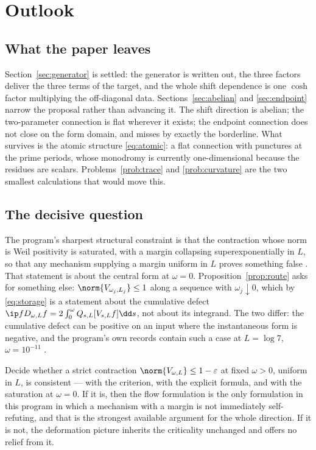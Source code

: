 \section{Outlook}\label{sec:outlook}

\subsection{What the paper leaves}

Section~\ref{sec:generator} is settled: the generator is written out, the three
factors deliver the three terms of the target, and the whole shift dependence is
one $\cosh$ factor multiplying the off-diagonal data. Sections~\ref{sec:abelian}
and \ref{sec:endpoint} narrow the proposal rather than advancing it. The shift
direction is abelian; the two-parameter connection is flat wherever it exists;
the endpoint connection does not close on the form domain, and misses by exactly
the borderline. What survives is the atomic structure \eqref{eq:atomic}: a flat
connection with punctures at the prime periods, whose monodromy is currently
one-dimensional because the residues are scalars. Problems~\ref{prob:trace} and
\ref{prob:curvature} are the two smallest calculations that would move this.

\subsection{The decisive question}

The program's sharpest structural constraint is that the contraction whose norm
is Weil positivity is saturated, with a margin collapsing superexponentially in
$L$, so that any mechanism supplying a margin uniform in $L$ proves something
false \cite{Selection}. That statement is about the central form at $\omega=0$.
Proposition~\ref{prop:route} asks for something else: $\norm{V_{\omega_j,L_j}}\leq1$
along a sequence with $\omega_j\downarrow0$, which by \eqref{eq:storage} is a
statement about the cumulative defect
$\ip f{D_{\omega,L}f}=2\int_0^\omega Q_{s,L}[V_{s,L}f]\dd s$, not about its
integrand. The two differ: the cumulative defect can be positive on an input
where the instantaneous form is negative, and the program's own records contain
such a case at $L=\log7$, $\omega=10^{-11}$ \cite{Background}.

\begin{problem}
\label{prob:criticality}
Decide whether a strict contraction $\norm{V_{\omega,L}}\leq1-\varepsilon$ at
fixed $\omega>0$, uniform in $L$, is consistent --- with the criterion, with the
explicit formula, and with the saturation at $\omega=0$. If it is, then the flow
formulation is the only formulation in this program in which a mechanism with a
margin is not immediately self-refuting, and that is the strongest available
argument for the whole direction. If it is not, the deformation picture inherits
the criticality unchanged and offers no relief from it.
\end{problem}

